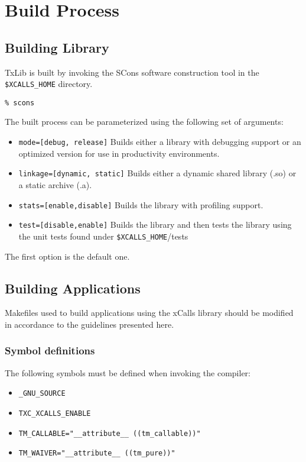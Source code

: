 \section{Build Process}

\subsection{Building Library}
TxLib is built by invoking the SCons software construction tool in   
the \verb!$XCALLS_HOME! directory.    

\begin{verbatim}
% scons
\end{verbatim}

\noindent The built process can be parameterized using the following set of arguments:

\begin{itemize}
\item \verb!mode=[debug, release]! Builds either a library with debugging
support or an optimized version for use in productivity environments.  
\item \verb!linkage=[dynamic, static]! Builds either a dynamic shared library (.so)
 or a static archive (.a).  
\item \verb!stats=[enable,disable]! Builds the library with profiling support.   
\item \verb!test=[disable,enable]! Builds the library and then tests the library 
using the unit tests found under \verb!$XCALLS_HOME!/tests   
\end{itemize}   

The first option is the default one. 

\subsection{Building Applications}
Makefiles used to build applications using the xCalls library should be 
modified in accordance to the guidelines presented here. 

\subsubsection{Symbol definitions}
The following symbols must be defined when invoking the compiler:
\begin{itemize}
\item \verb!_GNU_SOURCE!
\item \verb!TXC_XCALLS_ENABLE!
\item \verb!TM_CALLABLE="__attribute__ ((tm_callable))"!
\item \verb!TM_WAIVER="__attribute__ ((tm_pure))"!
\end{itemize}

